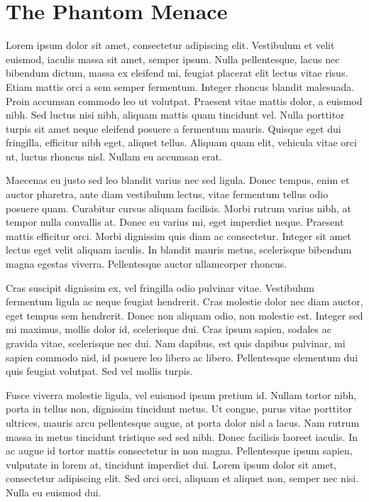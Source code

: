 \chapter{The Phantom Menace}

Lorem ipsum dolor sit amet, consectetur adipiscing elit. Vestibulum et velit euismod, iaculis massa sit amet, semper ipsum. Nulla pellentesque, lacus nec bibendum dictum, massa ex eleifend mi, feugiat placerat elit lectus vitae risus. Etiam mattis orci a sem semper fermentum. Integer rhoncus blandit malesuada. Proin accumsan commodo leo ut volutpat. Praesent vitae mattis dolor, a euismod nibh. Sed luctus nisi nibh, aliquam mattis quam tincidunt vel. Nulla porttitor turpis sit amet neque eleifend posuere a fermentum mauris. Quisque eget dui fringilla, efficitur nibh eget, aliquet tellus. Aliquam quam elit, vehicula vitae orci ut, luctus rhoncus nisl. Nullam eu accumsan erat.

Maecenas eu justo sed leo blandit varius nec sed ligula. Donec tempus, enim et auctor pharetra, ante diam vestibulum lectus, vitae fermentum tellus odio posuere quam. Curabitur cursus aliquam facilisis. Morbi rutrum varius nibh, at tempor nulla convallis at. Donec eu varius mi, eget imperdiet neque. Praesent mattis efficitur orci. Morbi dignissim quis diam ac consectetur. Integer sit amet lectus eget velit aliquam iaculis. In blandit mauris metus, scelerisque bibendum magna egestas viverra. Pellentesque auctor ullamcorper rhoncus.

Cras suscipit dignissim ex, vel fringilla odio pulvinar vitae. Vestibulum fermentum ligula ac neque feugiat hendrerit. Cras molestie dolor nec diam auctor, eget tempus sem hendrerit. Donec non aliquam odio, non molestie est. Integer sed mi maximus, mollis dolor id, scelerisque dui. Cras ipsum sapien, sodales ac gravida vitae, scelerisque nec dui. Nam dapibus, est quis dapibus pulvinar, mi sapien commodo nisl, id posuere leo libero ac libero. Pellentesque elementum dui quis feugiat volutpat. Sed vel mollis turpis.

Fusce viverra molestie ligula, vel euismod ipsum pretium id. Nullam tortor nibh, porta in tellus non, dignissim tincidunt metus. Ut congue, purus vitae porttitor ultrices, mauris arcu pellentesque augue, at porta dolor nisl a lacus. Nam rutrum massa in metus tincidunt tristique sed sed nibh. Donec facilisis laoreet iaculis. In ac augue id tortor mattis consectetur in non magna. Pellentesque ipsum sapien, vulputate in lorem at, tincidunt imperdiet dui. Lorem ipsum dolor sit amet, consectetur adipiscing elit. Sed orci orci, aliquam et aliquet non, semper nec nisi. Nulla eu euismod dui.

